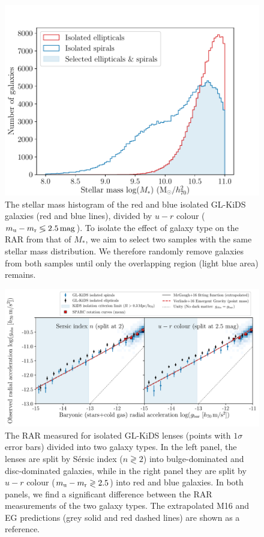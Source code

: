 \documentclass[usenatbib]{mnras}
\newcommand{\magn}{\, {\rm mag} }
\newcommand{\un}[1]{_{\rm #1}}
\begin{document}
\begin{figure}
	\includegraphics[width=\columnwidth]{Figures/mass_range_selection_offsetx0.pdf}
	\caption{The stellar mass histogram of the red and blue isolated GL-KiDS galaxies (red and blue lines), divided by $u-r$ colour ($m\un{u} - m\un{r} \lessgtr 2.5 \magn$). To isolate the effect of galaxy type on the RAR from that of $M_*$, we aim to select two samples with the same stellar mass distribution. We therefore randomly remove galaxies from both samples until only the overlapping region (light blue area) remains.}
	\label{fig:galtypes_masshist}
\end{figure}


\begin{figure}
	\includegraphics[width=\textwidth]{Figures/RAR_KiDS_galtypes_isolated_samemass.pdf}
	\caption{The RAR measured for isolated GL-KiDS lenses (points with $1\sigma$ error bars) divided into two galaxy types. In the left panel, the lenses are split by S\'ersic index ($n\gtrless2$) into bulge-dominated and disc-dominated galaxies, while in the right panel they are split by $u-r$ colour ($m\un{u} - m\un{r} \gtrless 2.5$) into red and blue galaxies. In both panels, we find a significant difference between the RAR measurements of the two galaxy types. The extrapolated M16 and EG predictions (grey solid and red dashed lines) are shown as a reference.}
	\label{fig:RAR_kids_galtypebins}
\end{figure}
\end{document}
